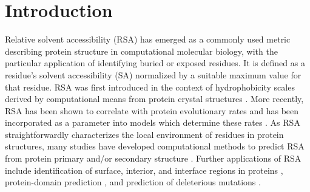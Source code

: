 \documentclass[11pt]{article}
\begin{document}

\section*{Introduction}

Relative solvent accessibility (RSA) has emerged as a commonly used metric describing protein structure in computational molecular biology, with the particular application of identifying buried or exposed residues. It is defined as a residue's solvent accessibility (SA) normalized by a suitable maximum value for that residue.  RSA was first introduced in the context of hydrophobicity scales derived by computational means from protein crystal structures \cite{Chothia1976,Rose1985,Miller1987,Moelbert2004,Shaytan2009}. More recently, RSA has been shown to correlate with protein evolutionary rates and has been incorporated as a parameter into models which determine these rates \cite{Goldmanetal1998,Bloometal2006,FranzosaXia2009,Zhouetal2009,FranzosaXia2012,Scherrer2012,MeyerWilke2012,ConantStadler2009}. As RSA straightforwardly characterizes the local environment of residues in protein structures, many studies have developed computational methods to predict RSA from protein primary and/or secondary structure \cite{RostSander1994,Pollastrietal2002,KimPark2004,NguyenRajapakse2005}. Further applications of RSA include identification of surface, interior, and interface regions in proteins \cite{Levy2010}, protein-domain prediction \cite{Chengetal2006}, and prediction of deleterious mutations \cite{ChenZhou2005}.
 
\end{document}
